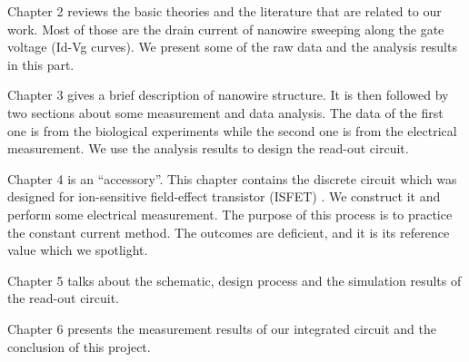 Chapter 2 reviews the basic theories and the literature that are related to our work.
Most of those are the drain current of nanowire sweeping along the gate voltage (Id-Vg curves).
We present some of the raw data and the analysis results in this part.

Chapter 3 gives a brief description of nanowire structure.
It is then followed by two sections about some measurement and data analysis.
The data of the first one is from the biological experiments while the second one is from the electrical measurement.
We use the analysis results to design the read-out circuit.

Chapter 4 is an ``accessory''.
This chapter contains the discrete circuit which was designed for ion-sensitive field-effect transistor (ISFET) \cite{SF1}.
We construct it and perform some electrical measurement.
The purpose of this process is to practice the constant current method.
The outcomes are deficient, and it is its reference value which we spotlight.

Chapter 5 talks about the schematic, design process and the simulation results of the read-out circuit.

Chapter 6 presents the measurement results of our integrated circuit and the conclusion of this project.








%
%
%
%

%
%




